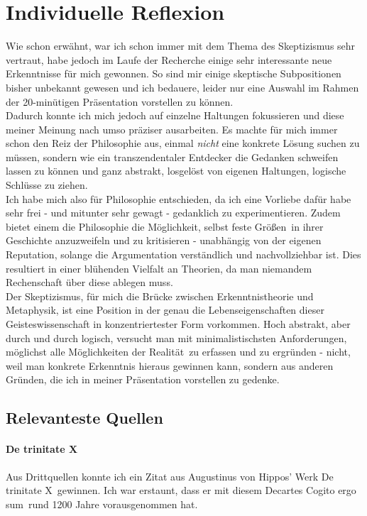 \documentclass[12pt,a4paper,final]{article}
\begin{document}
\section*{Individuelle Reflexion}
Wie schon erwähnt, war ich schon immer mit dem Thema des Skeptizismus sehr vertraut, habe jedoch im Laufe der Recherche einige sehr interessante neue Erkenntnisse für mich gewonnen. So sind mir einige skeptische Subpositionen bisher unbekannt gewesen und ich bedauere, leider nur eine Auswahl im Rahmen der 20-minütigen Präsentation vorstellen zu können.\\
Dadurch konnte ich mich jedoch auf einzelne Haltungen fokussieren und diese meiner Meinung nach umso präziser ausarbeiten. Es machte für mich immer schon den Reiz der Philosophie aus, einmal \emph{nicht} eine konkrete Lösung suchen zu müssen, sondern wie ein transzendentaler Entdecker die Gedanken schweifen lassen zu können und ganz abstrakt, losgelöst von eigenen Haltungen, logische Schlüsse zu ziehen.\\%

Ich habe mich also für Philosophie entschieden, da ich eine Vorliebe dafür habe sehr frei - und mitunter sehr gewagt - gedanklich zu experimentieren. Zudem bietet einem die Philosophie die Möglichkeit, selbst feste \glqq Größen\grqq\ in ihrer Geschichte anzuzweifeln und zu kritisieren - unabhängig von der eigenen Reputation, solange die Argumentation verständlich und nachvollziehbar ist. Dies resultiert in einer blühenden Vielfalt an Theorien, da man niemandem Rechenschaft über diese ablegen muss.\\
Der Skeptizismus, für mich die Brücke zwischen Erkenntnistheorie und Metaphysik, ist eine Position in der genau die Lebenseigenschaften dieser Geisteswissenschaft in konzentriertester Form vorkommen. Hoch abstrakt, aber durch und durch logisch, versucht man mit minimalistischsten Anforderungen, möglichst alle Möglichkeiten der \glqq Realität\grqq\ zu erfassen und zu ergründen - nicht, weil man konkrete Erkenntnis hieraus gewinnen kann, sondern aus anderen Gründen, die ich in meiner Präsentation vorstellen zu gedenke.
\subsection*{Relevanteste Quellen}
\paragraph*{De trinitate X \cite{de_trini_x}} Aus Drittquellen konnte ich ein Zitat aus Augustinus von Hippos' Werk \glqq De trinitate X\grqq\  gewinnen. Ich war erstaunt, dass er mit diesem Decartes \glqq Cogito ergo sum\grqq\ rund 1200 Jahre
vorausgenommen hat. %
\end{document}
